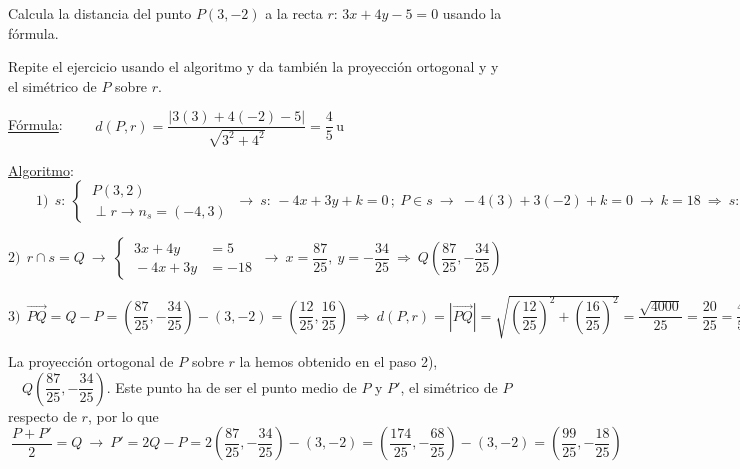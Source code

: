 \begin{miejemplo}

Calcula la distancia del punto $P(3,-2)$ a la recta $r:\, 3x+4y-5=0$ usando la fórmula.

\vspace{2mm} Repite el ejercicio usando el algoritmo y da también la proyección ortogonal y  y el simétrico de $P$ sobre $r$.

\vspace{8mm} \underline{Fórmula}: $\qquad d(P,r)=\dfrac{|3(3)+4(-2)-5|}{\sqrt{3^2+4^2}}=\dfrac{4}{5}\, \mathrm{u}$

\vspace{6mm} \underline{Algoritmo}: $\qquad 1)\ \  s:\ \begin{cases} \ P(3,2) \\ \ \perp r \to n_s=(-4,3) \end{cases} \ \to \ s:\, -4x+3y+k=0\, ; \ P\in s \ \to \ -4(3)+3(-2)+k=0 \ \to \ k=18 \ \Rightarrow \ s:\, -4x+3y+18=0$

\vspace{2mm} $2)\ \ r\cap s=Q \ \to \ \begin{cases} \ 3x+4y&=5 \\ \ -4x+3y&=-18 \end{cases} \ \to \  x=\dfrac{87}{25},\ y=-\dfrac{34}{25} \ \Rightarrow \ Q\left(\dfrac{87}{25},-\dfrac{34}{25} \right)$

\vspace{2mm} $3)\ \ \overrightarrow{PQ}=Q-P=\left(\dfrac{87}{25},-\dfrac{34}{25} \right)-(3,-2)=\left( \dfrac{12}{25}, \dfrac{16}{25} \right) \ \Rightarrow \  d(P,r)=|\overrightarrow{PQ}|=\sqrt{\left( \dfrac{12}{25} \right)^2 + \left( \dfrac{16}{25} \right)^2 }=\dfrac{\sqrt{4000}}{25}=\dfrac{20}{25}=\dfrac 4 5 \, \mathrm{u}$

\vspace{2mm} La proyección ortogonal de $P$ sobre $r$ la hemos obtenido en el paso 2), $\quad Q\left(\dfrac{87}{25},-\dfrac{34}{25} \right)$. Este punto ha de ser el punto medio de $P$ y $P'$, el simétrico de $P$ respecto de $r$, por lo que $\ \dfrac{P+P'}{2}=Q \ \to \ P'=2Q-P=2 \left(\dfrac{87}{25},-\dfrac{34}{25} \right)-(3,-2)=\left(\dfrac{174}{25},-\dfrac{68}{25} \right)-(3,-2)= \left( \dfrac{99}{25}, -\dfrac{18}{25} \right)$


\end{miejemplo}



